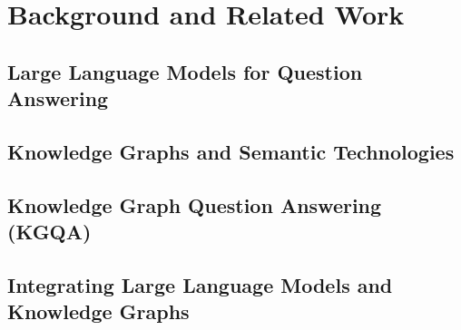 \chapter{Background and Related Work}
\label{chap:related_work}

\section{Large Language Models for Question Answering}
\label{sec:rw_llms_qa}


\section{Knowledge Graphs and Semantic Technologies}
\label{sec:rw_kgs}


\section{Knowledge Graph Question Answering (KGQA)}
\label{sec:rw_kgqa}


\section{Integrating Large Language Models and Knowledge Graphs}
\label{sec:rw_llm_kg_integration}


